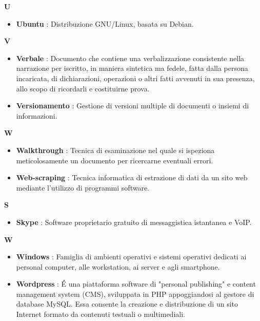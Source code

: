\newpage
{\huge \textbf{U}}
\begin{flushleft}
\begin{itemize}[label={}]
\item \textbf{Ubuntu} : Distribuzione GNU/Linux, basata su Debian.
\end{itemize}
\end{flushleft}
\newpage
{\huge \textbf{V}}
\begin{flushleft}
\begin{itemize}[label={}]
\item \textbf{Verbale} : Documento che contiene una verbalizzazione consistente nella narrazione per iscritto, in maniera sintetica ma fedele, fatta dalla persona incaricata, di dichiarazioni, operazioni o altri fatti avvenuti in sua presenza, allo scopo di ricordarli e costituirne prova.
\item \textbf{Versionamento} : Gestione di versioni multiple di documenti o insiemi di informazioni.
\end{itemize}
\end{flushleft}
\newpage
{\huge \textbf{W}}
\begin{flushleft}
\begin{itemize}[label={}]
\item \textbf{Walkthrough} : Tecnica di esaminazione nel quale si ispeziona meticolosamente un documento per ricercarne eventuali errori.
\item \textbf{Web-scraping} : Tecnica informatica di estrazione di dati da un sito web mediante l'utilizzo di programmi software.
\end{itemize}
\end{flushleft}
\newpage
{\huge \textbf{S}}
\begin{flushleft}
\begin{itemize}[label={}]
\item \textbf{Skype} : Software proprietario gratuito di messaggistica istantanea e VoIP.
\end{itemize}
\end{flushleft}
\newpage
{\huge \textbf{W}}
\begin{flushleft}
\begin{itemize}[label={}]
\item \textbf{Windows} : Famiglia di ambienti operativi e sistemi operativi dedicati ai personal computer, alle workstation, ai server e agli smartphone.
\item \textbf{Wordpress} : \'{E} una piattaforma software di "personal publishing" e content management system (CMS), sviluppata in PHP appoggiandosi al gestore di database MySQL. Essa consente la creazione e distribuzione di un sito Internet formato da contenuti testuali o multimediali.
\end{itemize}
\end{flushleft}
\newpage
